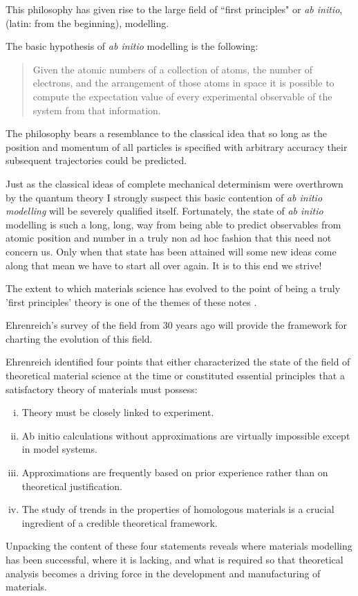 This philosophy has given rise to the large field of ``first principles" or {\it ab initio}, 
(latin: from the beginning), modelling. 
%

The basic hypothesis of {\it ab initio} modelling is the following:  

\begin{quote}
Given the atomic numbers of a collection of atoms,
the number of electrons, and the arrangement of those atoms 
in space it is possible to compute
the expectation value of every experimental
observable of the system from that information.
\end{quote}

The philosophy bears a resemblance to the classical idea
that so long as the position and momentum of all particles 
is specified with arbitrary accuracy their subsequent 
trajectories could be predicted. 

Just as the classical ideas of complete mechanical determinism were
overthrown by the quantum theory I strongly suspect this
basic contention of {\it ab initio modelling} 
will be severely qualified itself. Fortunately, the 
state of {\it ab initio} modelling is such a long, long, way from being
able to predict observables from atomic position and number
in a truly non ad hoc fashion that this need not concern us. 
Only when that state has been attained
will some new ideas come along that mean 
we have to start all over again. It is to 
this end we strive!

The extent to which materials science has evolved to the point of being 
a truly 'first principles' theory is one of the themes of these notes \cite{finnis12, ismailbeigi2017}.
%
%

Ehrenreich's survey of the field from 30 years ago will provide the framework 
for charting the evolution of this field.

Ehrenreich identified four points that either characterized the state 
of the field of theoretical material science at the time or constituted essential principles 
that a satisfactory theory of materials must possess:
%
\begin{enumerate}[i)]
\label{en:ehrenreich}
\item Theory must be closely linked to experiment.
\item Ab initio calculations without approximations are virtually impossible 
      except in model systems.
\item Approximations are frequently based on prior experience rather 
      than on theoretical justification.
\item The study of trends in the properties of homologous materials 
      is a crucial ingredient of a credible theoretical framework.
\end{enumerate}
%
Unpacking the content of these four statements reveals where 
materials modelling has been successful, where it is lacking,
and what is required so that theoretical analysis becomes a driving
force in the development and manufacturing of materials.

